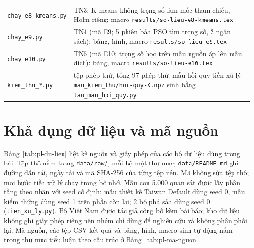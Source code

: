 {\begin{longtable}{@{}>{\raggedright\arraybackslash}p{4.4cm}>{\raggedright\arraybackslash}p{10.4cm}@{}}
\texttt{chay\_e8\_kmeans.py} & TN3: K-means không trọng số làm mốc tham chiếu, Holm riêng; macro \texttt{results/so-lieu-e8-kmeans.tex} \\
\texttt{chay\_e9.py} & TN4 (mã E9; 5 phiên bản PSO tìm trọng số, 2 ngân sách): bảng, hình, macro \texttt{results/so-lieu-e9.tex} \\
\texttt{chay\_e10.py} & TN5 (mã E10; trọng số học trên mẫu nguồn áp lên mẫu đích): bảng, macro \texttt{results/so-lieu-e10.tex} \\
\texttt{kiem\_thu\_*.py} & 9 tệp phép thử, tổng 97 phép thử; mẫu hồi quy tiền xử lý \texttt{mau\_kiem\_thu/hoi-quy-X.npz} sinh bằng \texttt{tao\_mau\_hoi\_quy.py} \\
\bottomrule
\end{longtable}
}

\section*{Khả dụng dữ liệu và mã nguồn}

Bảng~\ref{tab:pl-du-lieu} liệt kê nguồn và giấy phép của các bộ dữ liệu dùng trong bài. Tệp thô nằm trong
\texttt{data/raw/}, mỗi bộ một thư mục; \texttt{data/README.md} ghi đường dẫn tải, ngày tải và mã SHA-256 của từng tệp
nén. Mã không sửa tệp thô; mọi bước tiền xử lý chạy trong bộ nhớ. Mẫu con 5.000 quan sát được lấy phân tầng theo nhãn với
seed cố định: mẫu thiết kế Taiwan Default dùng seed 0, mẫu kiểm chứng dùng seed 1 trên phần còn lại; 2 bộ phá sản dùng
seed 0 (\texttt{tien\_xu\_ly.py}). Bộ Việt Nam được tác giả công bố kèm bài báo; kho dữ liệu không ghi giấy phép riêng nên
nhóm chỉ dùng để nghiên cứu và không phân phối lại. Mã nguồn, các tệp CSV kết quả và bảng, hình, macro sinh tự động nằm
trong thư mục tiểu luận theo cấu trúc ở Bảng~\ref{tab:pl-ma-nguon}.


